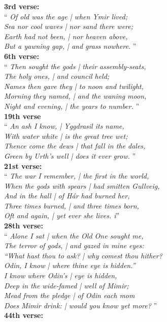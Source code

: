 \textbf{3rd verse:}\\
``\emph{
Of old was the age | when Ymir lived; \\
Sea nor cool waves | nor sand there were; \\
Earth had not been, | nor heaven above, \\
But a yawning gap, | and grass nowhere. 
}'' \\
\textbf{6th verse:}\\
``\emph{
Then sought the gods | their assembly-seats, \\
The holy ones, | and council held; \\
Names then gave they | to noon and twilight, \\
Morning they named, | and the waning moon, \\
Night and evening, | the years to number.
}'' \\
\textbf{19th verse}\\
``\emph{
An ash I know, | Yggdrasil its name, \\
With water white | is the great tree wet; \\
Thence come the dews | that fall in the dales, \\
Green by Urth's well | does it ever grow.
}'' \\
\textbf{21st verse:}\\
``\emph{
The war I remember, | the first in the world, \\
When the gods with spears | had smitten Gullveig, \\
And in the hall | of Hár had burned her, \\
Three times burned, | and three times born, \\
Oft and again, | yet ever she lives.
i}'' \\
\textbf{28th verse:}\\
``\emph{
Alone I sat | when the Old One sought me, \\
The terror of gods, | and gazed in mine eyes: \\
``What hast thou to ask? | why comest thou hither? \\
Odin, I know | where thine eye is hidden.''\\
I know where Odin's | eye is hidden, \\
Deep in the wide-famed | well of Mimir; \\
Mead from the pledge | of Odin each mom \\
Does Mimir drink: | would you know yet more? 
}'' \\
\textbf{44th verse:}\\
